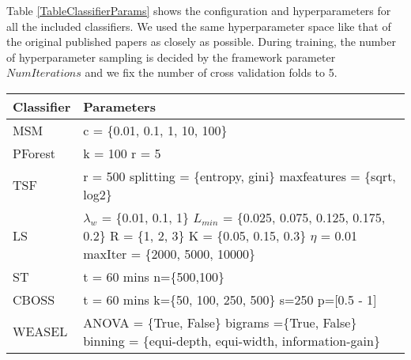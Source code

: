 Table \ref{TableClassifierParams} shows the configuration and hyperparameters for all the included classifiers.
We used the same hyperparameter space like that of the original published papers as closely as possible.
During training, the number of hyperparameter sampling is decided by the framework parameter $NumIterations$ and we fix the number of cross validation folds to 5.

\begin{table}[hbt!]
  \setlength\extrarowheight{2pt} %
  \begin{tabularx}{\textwidth}{|X|X|}
  \hline
  \textbf{Classifier} & \textbf{Parameters} \\ \hline
  MSM                 & c = \{0.01, 0.1, 1, 10, 100\}                                                        \\ \hline
  PForest             & k = 100 \newline r = 5                                                               \\ \hline
  TSF                 & r = 500 \newline splitting = \{entropy, gini\} \newline maxfeatures = \{sqrt, log2\} \\ \hline
  LS                  & $\lambda_{w}$ = \{0.01, 0.1, 1\} \newline
                        $L_{min}$ = \{0.025, 0.075, 0.125, 0.175, 0.2\} \newline R = \{1, 2, 3\} \newline
                        K = \{0.05, 0.15, 0.3\} \newline $\eta$ = 0.01 \newline
                        maxIter = \{2000, 5000, 10000\}                                                      \\ \hline
  ST                  & t = 60 mins \newline n=\{500,100\}                                                   \\ \hline
  CBOSS               & t = 60 mins \newline k=\{50, 100, 250, 500\} \newline s=250 \newline p=[0.5 - 1]     \\ \hline
  WEASEL              & ANOVA = \{True, False\} \newline bigrams =\{True, False\}
                        \newline binning = \{equi-depth, equi-width, information-gain\}                      \\ \hline

\end{tabularx}
\end{table}
